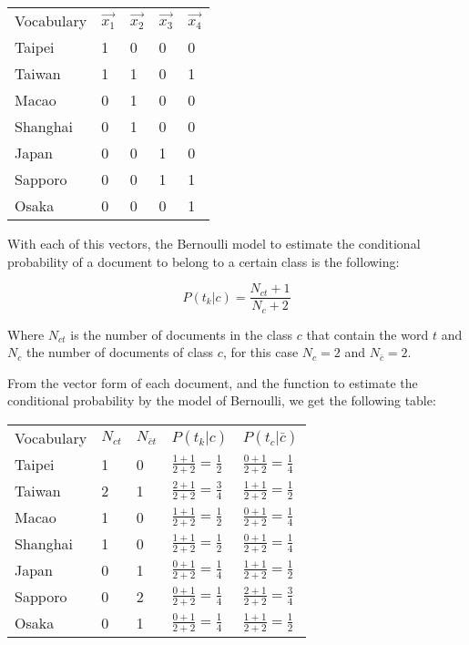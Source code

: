 \begin{table}[H]
\begin{tabular}{lllll}
Vocabulary  & $\vec{x_1}$ &  $\vec{x_2}$ & $\vec{x_3}$  & $\vec{x_4}$ \\
Taipei      & 1 & 0 & 0 & 0 \\
Taiwan      & 1 & 1 & 0 & 1 \\
Macao       & 0 & 1 & 0 & 0 \\
Shanghai    & 0 & 1 & 0 & 0 \\
Japan       & 0 & 0 & 1 & 0 \\
Sapporo     & 0 & 0 & 1 & 1 \\
Osaka       & 0 & 0 & 0 & 1 
\end{tabular}
\end{table}

With each of this vectors, the Bernoulli model to estimate the conditional probability of a document to belong to a certain class is the following:

\begin{equation}
    P(t_k|c) = \frac{N_{ct}+1}{N_c+2}
\end{equation}

Where $N_{ct}$ is the number of documents in the class $c$ that contain the word $t$ and $N_c$ the number of documents of class $c$, for this case $N_c = 2$ and $N_{\bar{c}} = 2$.

From the vector form of each document, and the function to estimate the conditional probability by the model of Bernoulli, we get the following table:

\begin{table}[H]
\begin{tabular}{lllll}
Vocabulary  & $N_{ct}$ & $N_{\bar{c}t}$ & $P(t_k|c)$ &  $P(t_c|\bar{c})$ \\
Taipei      & 1 & 0 & $\frac{1+1}{2+2} = \frac{1}{2}$ & $\frac{0+1}{2+2} = \frac{1}{4}$ \\
Taiwan      & 2 & 1 & $\frac{2+1}{2+2} = \frac{3}{4}$ & $\frac{1+1}{2+2} = \frac{1}{2}$ \\
Macao       & 1 & 0 & $\frac{1+1}{2+2} = \frac{1}{2}$ & $\frac{0+1}{2+2} = \frac{1}{4}$ \\
Shanghai    & 1 & 0 & $\frac{1+1}{2+2} = \frac{1}{2}$ & $\frac{0+1}{2+2} = \frac{1}{4}$ \\
Japan       & 0 & 1 & $\frac{0+1}{2+2} = \frac{1}{4}$ & $\frac{1+1}{2+2} = \frac{1}{2}$ \\
Sapporo     & 0 & 2 & $\frac{0+1}{2+2} = \frac{1}{4}$ & $\frac{2+1}{2+2} = \frac{3}{4}$ \\
Osaka       & 0 & 1 & $\frac{0+1}{2+2} = \frac{1}{4}$ & $\frac{1+1}{2+2} = \frac{1}{2}$
\end{tabular}
\end{table}

